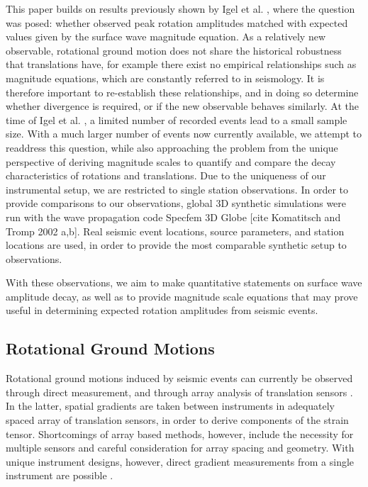 \documentclass{gji}
\begin{document}
This paper builds on results previously shown by Igel et al. , 
where the question was posed: whether observed peak rotation amplitudes matched with expected values given by the surface wave magnitude equation. 
As a relatively new observable, rotational ground motion does not share the historical robustness that translations have, for example there exist no empirical relationships such as magnitude equations, which are constantly referred to in seismology. It is therefore important to re-establish these relationships, and in doing so determine whether divergence is required, or if the new observable behaves similarly.
At the time of Igel et al. , a limited number of recorded events lead to a small sample size. With a much larger number of events now currently available, we attempt to readdress this question, while also approaching the problem from the unique perspective of deriving magnitude scales to quantify and compare the decay characteristics of rotations and translations. Due to the uniqueness of our instrumental setup, we are restricted to single station observations. In order to provide comparisons to our observations, global 3D synthetic simulations were run with the wave propagation code Specfem 3D Globe [cite Komatitsch and Tromp 2002 a,b]. Real seismic event locations, source parameters, and station locations are used, in order to provide the most comparable synthetic setup to observations. 

With these observations, we aim to make quantitative statements on surface wave amplitude decay, as well as to provide magnitude scale equations that may prove useful in determining expected rotation amplitudes from seismic events.

\subsection{Rotational Ground Motions}
Rotational ground motions induced by seismic events can currently be observed through direct measurement, and through array analysis of translation sensors \cite{spudich1995transient}.
In the latter, spatial gradients are taken between instruments in adequately spaced array of translation sensors, in order to derive components of the strain tensor. Shortcomings of array based methods, however, include the necessity for multiple sensors and careful consideration for array spacing and geometry. With unique instrument designs, however, direct gradient measurements from a single instrument are  possible \cite{schreiber2006ring}. %
\end{document}
